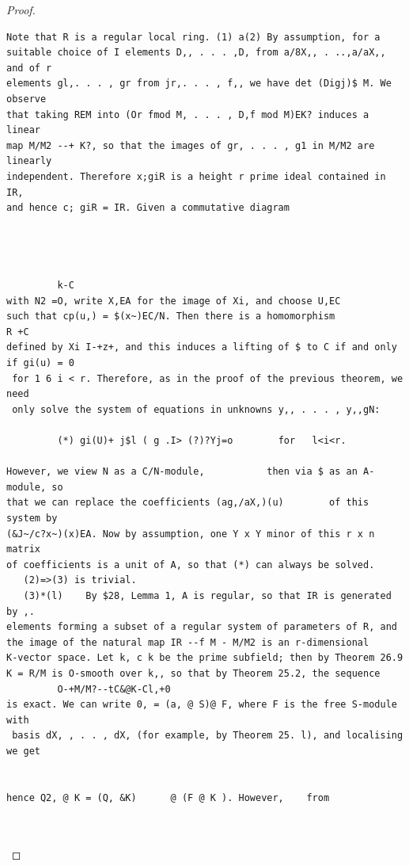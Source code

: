\begin{proof}
\begin{verbatim}
Note that R is a regular local ring. (1) a(2) By assumption, for a
suitable choice of I elements D,, . . . ,D, from a/8X,, . ..,a/aX,, and of r
elements gl,. . . , gr from jr,. . . , f,, we have det (Digj)$ M. We observe
that taking REM into (Or fmod M, . . . , D,f mod M)EK? induces a linear
map M/M2 --+ K?, so that the images of gr, . . . , g1 in M/M2 are linearly
independent. Therefore x;giR is a height r prime ideal contained in IR,
and hence c; giR = IR. Given a commutative diagram




         k-C
with N2 =O, write X,EA for the image of Xi, and choose U,EC
such that cp(u,) = $(x~)EC/N. Then there is a homomorphism               R +C
defined by Xi I-+z+, and this induces a lifting of $ to C if and only if gi(u) = 0
 for 1 6 i < r. Therefore, as in the proof of the previous theorem, we need
 only solve the system of equations in unknowns y,, . . . , y,,gN:

         (*) gi(U)+ j$l ( g .I> (?)?Yj=o        for   l<i<r.

However, we view N as a C/N-module,           then via $ as an A-module, so
that we can replace the coefficients (ag,/aX,)(u)        of this system by
(&J~/c?x~)(x)EA. Now by assumption, one Y x Y minor of this r x n matrix
of coefficients is a unit of A, so that (*) can always be solved.
   (2)=>(3) is trivial.
   (3)*(l)    By $28, Lemma 1, A is regular, so that IR is generated by ,.
elements forming a subset of a regular system of parameters of R, and
the image of the natural map IR --f M - M/M2 is an r-dimensional
K-vector space. Let k, c k be the prime subfield; then by Theorem 26.9
K = R/M is O-smooth over k,, so that by Theorem 25.2, the sequence
         O-+M/M?--tC&@K-Cl,+0
is exact. We can write 0, = (a, @ S)@ F, where F is the free S-module with
 basis dX, , . . , dX, (for example, by Theorem 25. l), and localising we get


hence Q2, @ K = (Q, &K)      @ (F @ K ). However,    from



\end{verbatim}
\end{proof}
